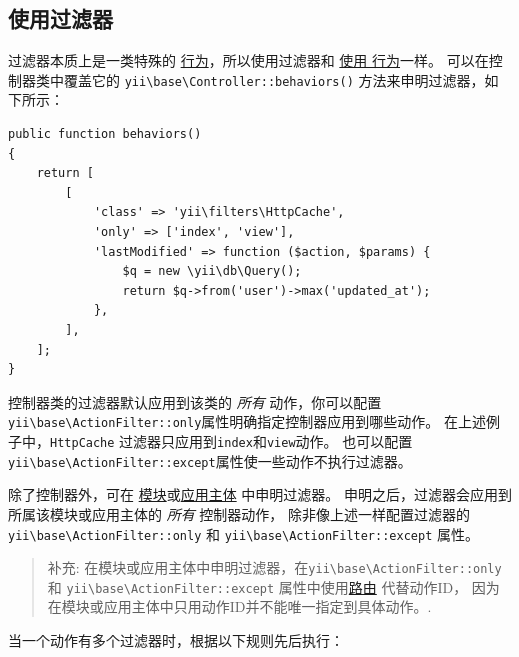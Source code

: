 \subsection{使用过滤器 \label{structure-filters.md::using-filters}}
过滤器本质上是一类特殊的 \hyperref[concept-behaviors.md]{行为}，所以使用过滤器和 \hyperref[concept-behaviors.md::attaching-behaviors]{使用 行为}一样。
可以在控制器类中覆盖它的 \texttt{yii{\allowbreak{}\textbackslash}base{\allowbreak{}\textbackslash}Controller\allowbreak{}::\allowbreak{}behaviors()} 方法来申明过滤器，如下所示：

\lstset{language=php}\begin{lstlisting}
public function behaviors()
{
    return [
        [
            'class' => 'yii\filters\HttpCache',
            'only' => ['index', 'view'],
            'lastModified' => function ($action, $params) {
                $q = new \yii\db\Query();
                return $q->from('user')->max('updated_at');
            },
        ],
    ];
}
\end{lstlisting}
控制器类的过滤器默认应用到该类的 \textit{所有} 动作，你可以配置\texttt{yii{\allowbreak{}\textbackslash}base{\allowbreak{}\textbackslash}ActionFilter\allowbreak{}::\allowbreak{}only}属性明确指定控制器应用到哪些动作。
在上述例子中，\lstinline|HttpCache| 过滤器只应用到\lstinline|index|和\lstinline|view|动作。
也可以配置\texttt{yii{\allowbreak{}\textbackslash}base{\allowbreak{}\textbackslash}ActionFilter\allowbreak{}::\allowbreak{}except}属性使一些动作不执行过滤器。

除了控制器外，可在 \hyperref[structure-modules.md]{模块}或\hyperref[structure-applications.md]{应用主体} 中申明过滤器。
申明之后，过滤器会应用到所属该模块或应用主体的 \textit{所有} 控制器动作，
除非像上述一样配置过滤器的 \texttt{yii{\allowbreak{}\textbackslash}base{\allowbreak{}\textbackslash}ActionFilter\allowbreak{}::\allowbreak{}only} 和 \texttt{yii{\allowbreak{}\textbackslash}base{\allowbreak{}\textbackslash}ActionFilter\allowbreak{}::\allowbreak{}except} 属性。

\begin{quote}补充: 在模块或应用主体中申明过滤器，在\texttt{yii{\allowbreak{}\textbackslash}base{\allowbreak{}\textbackslash}ActionFilter\allowbreak{}::\allowbreak{}only} 和 \texttt{yii{\allowbreak{}\textbackslash}base{\allowbreak{}\textbackslash}ActionFilter\allowbreak{}::\allowbreak{}except}
  属性中使用\hyperref[structure-controllers.md::routes]{路由} 代替动作ID，
  因为在模块或应用主体中只用动作ID并不能唯一指定到具体动作。.

\end{quote}
当一个动作有多个过滤器时，根据以下规则先后执行：

